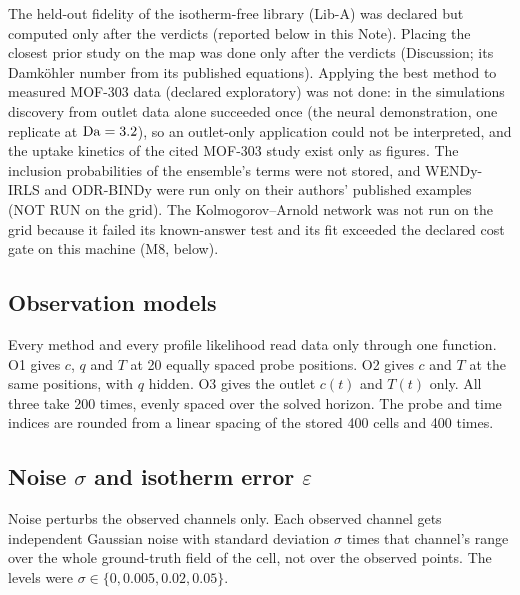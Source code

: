 \begin{itemize}
The held-out fidelity of the isotherm-free library
(Lib-A) was declared but computed only after the verdicts (reported below in this Note). Placing the closest prior
study on the map was done only after the verdicts (Discussion; its Damk\"ohler number from its
published equations). Applying the best method to measured MOF-303 data (declared exploratory)
was not done: in the simulations discovery from outlet data alone succeeded once (the neural
demonstration, one replicate at $\mathrm{Da} = 3.2$), so an outlet-only application could not be
interpreted, and the uptake kinetics of the cited MOF-303
study exist only as figures. The inclusion probabilities of the ensemble's terms were not stored,
and WENDy-IRLS and ODR-BINDy were run only on their authors' published examples (NOT RUN on the
grid). The Kolmogorov--Arnold network was not run on the grid because it failed its known-answer
test and its fit exceeded the declared cost gate on this machine (M8, below).
\end{itemize}

\subsection*{Observation models}
Every method and every profile likelihood read data only through one function. O1 gives
$c$, $q$ and $T$ at 20 equally spaced probe positions. O2 gives $c$ and $T$ at the same
positions, with $q$ hidden. O3 gives the outlet $c(t)$ and $T(t)$ only. All three take 200
times, evenly spaced over the solved horizon. The probe and time indices are rounded from
a linear spacing of the stored 400 cells and 400 times.

\subsection*{Noise $\sigma$ and isotherm error $\varepsilon$}
Noise perturbs the observed channels only. Each observed channel gets independent Gaussian
noise with standard deviation $\sigma$ times that channel's range over the whole
ground-truth field of the cell, not over the observed points. The levels were
$\sigma \in \{0, 0.005, 0.02, 0.05\}$.

